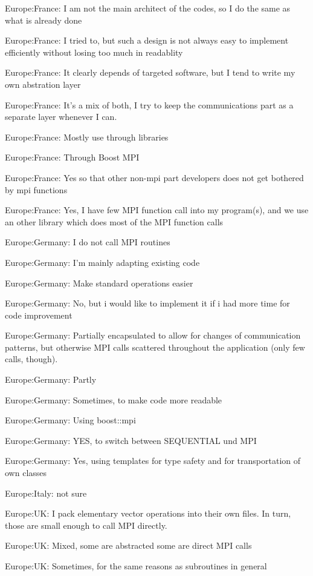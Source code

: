 \item Europe:France: I am not the main architect of the codes, so I do the same as what is already done
\item Europe:France: I tried to, but such a design is not always easy to implement efficiently without losing too much in readablity
\item Europe:France: It clearly depends of targeted software, but I tend to write my own abstration layer
\item Europe:France: It's a mix of both, I try to keep the communications part as a separate layer whenever I can.
\item Europe:France: Mostly use through libraries
\item Europe:France: Through Boost MPI
\item Europe:France: Yes so that other non-mpi part developers does not get bothered by mpi functions
\item Europe:France: Yes, I have few MPI function call into my program(s), and we use an other library which does most of the MPI function calls
\item Europe:Germany: I do not call MPI routines
\item Europe:Germany: I'm mainly adapting existing code
\item Europe:Germany: Make standard operations easier
\item Europe:Germany: No, but i would like to implement it if i had more time for code improvement
\item Europe:Germany: Partially encapsulated to allow for changes of communication patterns, but otherwise MPI calls scattered throughout the application (only few calls, though).
\item Europe:Germany: Partly
\item Europe:Germany: Sometimes, to make code more readable
\item Europe:Germany: Using boost::mpi
\item Europe:Germany: YES, to switch between SEQUENTIAL und MPI
\item Europe:Germany: Yes, using templates for type safety and for transportation of own classes
\item Europe:Italy: not sure
\item Europe:UK: I pack elementary vector operations into their own files. In turn, those are small enough to call MPI directly.
\item Europe:UK: Mixed, some are abstracted some are direct MPI calls
\item Europe:UK: Sometimes, for the same reasons as subroutines in general
